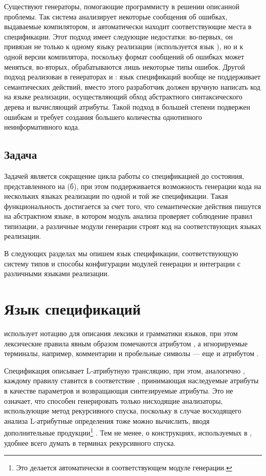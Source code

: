 Существуют генераторы, помогающие программисту в решении описанной проблемы. Так система  \cite{???} анализирует некоторые сообщения об ошибках, выдаваемые компилятором, и автоматически находит соответствующие места в спецификации. Этот подход имеет следующие недостатки: во-первых, он привязан не только к одному языку реализации (используется язык ), но и к одной версии компилятора, поскольку формат сообщений об ошибках может меняться, во-вторых, обрабатываются лишь некоторые типы ошибок. Другой подход реализован в генераторах  \cite{???} и  \cite{???}: язык спецификаций вообще не поддерживает семантических действий, вместо этого разработчик должен вручную написать код на языке реализации, осуществляющий обход абстрактного синтаксического дерева и вычисляющий атрибуты. Такой подход в большей степени подвержен ошибкам и требует создания большего количества однотипного неинформативного кода.

\section{Задача \ATF{}}

Задачей \ATF{} является сокращение цикла работы со спецификацией до состояния, представленного на  (б), при этом поддерживается возможность генерации кода на нескольких языках реализации по одной и той же спецификации.
Такая функциональность достигается за счет того, что семантические действия пишутся на абстрактном языке, в котором модуль анализа проверяет соблюдение правил типизации, а различные модули генерации строят код на соответствующих языках реализации.

В следующих разделах мы опишем язык спецификации, соответствующую систему типов и способы конфигурации модулей генерации и интеграции с различными языками реализации.

\chapter{Язык спецификаций \ATF{}}

\ATF{} использует нотацию \GRM{} для описания лексики и грамматики языков, при этом лексические правила явным образом помечаются атрибутом , а игнорируемые терминалы, например, комментарии и пробельные символы --- еще и атрибутом .

Спецификация описывает L-атрибутную трансляцию, при этом, аналогично , каждому правилу ставится в соответствие , принимающая наследуемые атрибуты в качестве параметров и возвращающая синтезируемые атрибуты. Это не означает, что \ATF{} способен генерировать только нисходящие анализаторы, использующие метод рекурсивного спуска, поскольку в случае восходящего анализа L-атрибутные определения тоже можно вычислить, вводя дополнительные продукции\footnote{Это делается автоматически в соответствующем модуле генерации.} \cite{???}. Тем не менее, о конструкциях, используемых в \ATF{}, удобнее всего думать в терминах рекурсивного спуска.

